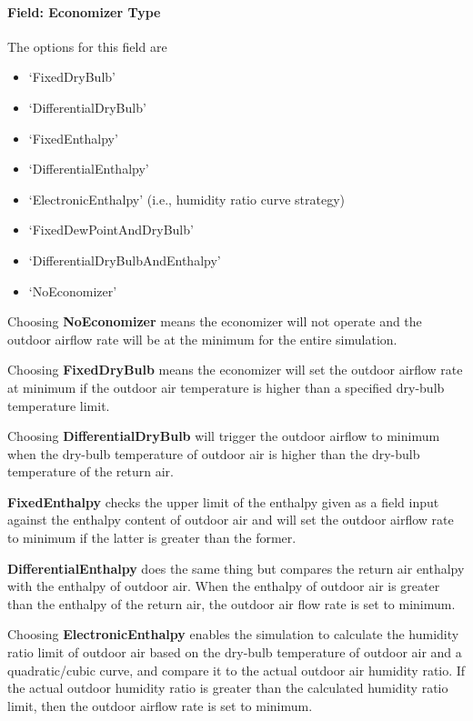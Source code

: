 \paragraph{Field: Economizer Type}\label{field-economizer-type-5}

The options for this field are

\begin{itemize}
\item
  `FixedDryBulb'
\item
  `DifferentialDryBulb'
\item
  `FixedEnthalpy'
\item
  `DifferentialEnthalpy'
\item
  `ElectronicEnthalpy' (i.e., humidity ratio curve strategy)
\item
  `FixedDewPointAndDryBulb'
\item
  `DifferentialDryBulbAndEnthalpy'
\item
  `NoEconomizer'
\end{itemize}

Choosing \textbf{NoEconomizer} means the economizer will not operate and the outdoor airflow rate will be at the minimum for the entire simulation.

Choosing \textbf{FixedDryBulb} means the economizer will set the outdoor airflow rate at minimum if the outdoor air temperature is higher than a specified dry-bulb temperature limit.

Choosing \textbf{DifferentialDryBulb} will trigger the outdoor airflow to minimum when the dry-bulb temperature of outdoor air is higher than the dry-bulb temperature of the return air.

\textbf{FixedEnthalpy} checks the upper limit of the enthalpy given as a field input against the enthalpy content of outdoor air and will set the outdoor airflow rate to minimum if the latter is greater than the former.

\textbf{DifferentialEnthalpy} does the same thing but compares the return air enthalpy with the enthalpy of outdoor air. When the enthalpy of outdoor air is greater than the enthalpy of the return air, the outdoor air flow rate is set to minimum.

Choosing \textbf{ElectronicEnthalpy} enables the simulation to calculate the humidity ratio limit of outdoor air based on the dry-bulb temperature of outdoor air and a quadratic/cubic curve, and compare it to the actual outdoor air humidity ratio. If the actual outdoor humidity ratio is greater than the calculated humidity ratio limit, then the outdoor airflow rate is set to minimum.

